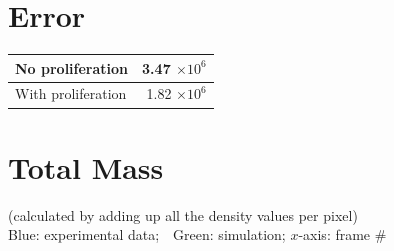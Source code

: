 \documentclass[12pt]{article}
\begin{document}
\section*{Error}
\begin{tabular}{| l | r |}
\hline
	No proliferation & 3.47 $\times 10^6$ \\ \hline
	With proliferation & 1.82 $\times 10^6$ \\ \hline
\end{tabular}

\vspace{2.5em}
\section*{Total Mass}
(calculated by adding up all the density values per pixel) \\
Blue: experimental data; \,\, Green: simulation; \qquad $x$-axis: frame \#

\begin{figure}[h!]
\end{figure}

\vspace{2.5em}
\end{document}
